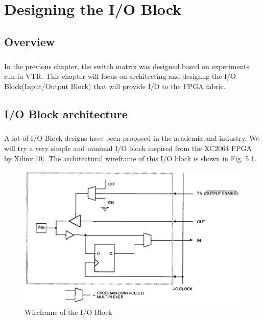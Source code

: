 %
%
\let\textcircled=\pgftextcircled
\chapter{Designing the I/O Block}
\label{chap:IO_BLOCK_design}
\paragraph{}

\section{Overview}

\paragraph{}
In the previous chapter, the switch matrix was designed based on experiments run in VTR. This chapter will focus on architecting and designng the I/O Block(Input/Output Block) that will provide I/O to the FPGA fabric.

\section{I/O Block architecture}
\paragraph{}

A lot of I/O Block designs have been proposed in the academia and industry. We will try a very simple and minimal I/O block inspired from the XC2064 FPGA by Xilinx[10]. The architectural wireframe of this I/O block is shown in Fig. 5.1.

\begin{figure}[H]
\centering
\includegraphics[width=\textwidth]{ioblock_wireframe.png}
\caption{Wireframe of the I/O Block}
\label{fig:Figure}
\end{figure}

